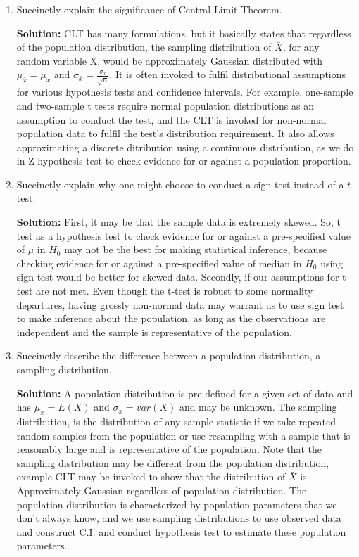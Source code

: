 \documentclass{article}
\begin{document}
\begin{enumerate}
  \item Succinctly explain the significance of Central Limit Theorem.\\
    \begin{minipage}[t][1.1in][t]{\textwidth}
    \textbf{Solution:} CLT has many formulations, but it basically states that regardless of the population distribution, the sampling distribution of $\bar{X}$, for any random variable X, would be approximately Gaussian distributed with $\mu_{\bar{x}}=\mu_{x}$ and $\sigma_{\bar{x}}=\frac{\sigma_{x}} {\sqrt{n}}$. It is often invoked to fulfil distributional assumptions for various hypothesis tests and confidence intervals. For example, one-sample and two-sample t tests require normal population distributions as an assumption to conduct the test, and the CLT is invoked for non-normal population data to fulfil the test's distribution requirement. It also allows approximating a discrete ditribution using a continuous distribution, as we do in Z-hypothesis test to check evidence for or against a population proportion.
    \end{minipage}
  \item Succinctly explain why one might choose to conduct a sign test instead
  of a $t$ test.\\
    \begin{minipage}[t][1.1in][t]{\textwidth}
    \textbf{Solution:} First, it may be that the sample data is extremely skewed. So, t test as a hypothesis test to check evidence for or against a pre-specified value of $\mu$ in $H_{0}$ may not be the best for making statistical inference, because checking evidence for or against a pre-specified value of median in  $H_{0}$ using sign test would be better for skewed data. Secondly, if our assumptions for t test are not met. Even though the t-test is robust to some normality departures, having grossly non-normal data may warrant us to use sign test to make inference about the population, as long as the observations are independent and the sample is representative of the population. 
    \end{minipage}
  \item Succinctly describe the difference between a population distribution, a sampling distribution.\\
    \begin{minipage}[t][1.1in][t]{\textwidth}
    \textbf{Solution:} A population distribution is pre-defined for a given set of data and has $\mu_{x}=E(X)$ and $\sigma_{x}=var(X)$ and may be unknown. The sampling distribution, is the distribution of any sample statistic if we take repeated random samples from the population or use resampling with a sample that is reasonably large and is representative of the population. Note that the sampling distribution may be different from the population distribution, example CLT may be invoked to show that the distribution of $\bar{X}$ is Approximately Gaussian regardless of population distribution. The population distribution is characterized by population parameters that we don't always know, and we use sampling distributions to use observed data and construct C.I. and conduct hypothesis test to estimate these population parameters.

\end{minipage}
\end{enumerate}
\end{document}
